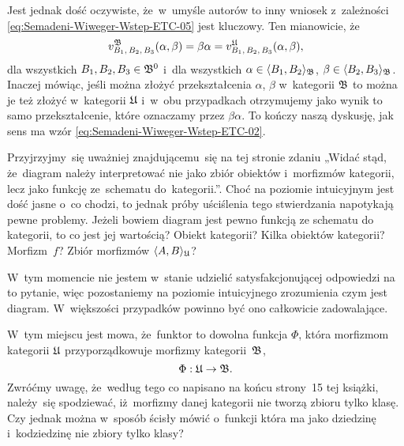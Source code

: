 \documentclass[a4paper,11pt]{article}
\numberwithin{equation}{section}
\begin{document}
Jest jednak dość oczywiste, że~w~umyśle autorów to inny wniosek z~zależności
\eqref{eq:Semadeni-Wiweger-Wstep-ETC-05} jest kluczowy. Ten mianowicie, że
\begin{equation}
  \label{eq:Semadeni-Wiweger-Wstep-ETC-07}
  v_{ B_{ 1 }, \, B_{ 2 }, \, B_{ 3 } }^{ \mathfrak{B} }( \alpha, \beta ) =
  \beta \alpha =
  v_{ B_{ 1 }, \, B_{ 2 }, \, B_{ 3 } }^{ \mathfrak{U} }( \alpha, \beta ),
\end{equation}
dla wszystkich $B_{ 1 }, B_{ 2 }, B_{ 3 } \in \mathfrak{B}^{ 0 }$ i~dla wszystkich
$\alpha \in \langle B_{ 1 }, B_{ 2 } \rangle_{ \mathfrak{B} }$, $\beta \in \langle B_{ 2 }, B_{ 3 } \rangle_{ \mathfrak{B} }$.
Inaczej mówiąc, jeśli można złożyć przekształcenia $\alpha$, $\beta$ w~kategorii
$\mathfrak{B}$ to można je też złożyć w~kategorii $\mathfrak{U}$ i~w~obu przypadkach
otrzymujemy jako wynik to samo przekształcenie, które oznaczamy przez
$\beta \alpha$. To kończy naszą dyskusję, jak sens ma wzór
\eqref{eq:Semadeni-Wiweger-Wstep-ETC-02}.

\VerSpaceFour





\noindent
{} Przyjrzyjmy~się uważniej znajdującemu~się na tej stronie zdaniu
„Widać stąd, że~diagram należy interpretować nie jako zbiór obiektów
i~morfizmów kategorii, lecz jako funkcję ze~schematu do~kategorii.”. Choć na
poziomie intuicyjnym jest dość jasne o~co chodzi, to jednak próby uściślenia
tego stwierdzania napotykają pewne problemy. Jeżeli bowiem diagram jest
pewno funkcją ze schematu do kategorii, to co jest jej wartością? Obiekt
kategorii? Kilka obiektów kategorii? Morfizm~$f$? Zbiór morfizmów
$\langle A, B \rangle_{ \mathfrak{U} }$?

W~tym momencie nie jestem w~stanie udzielić satysfakcjonującej odpowiedzi na
to pytanie, więc pozostaniemy na poziomie intuicyjnego zrozumienia czym jest
diagram. W~większości przypadków powinno być ono całkowicie zadowalające.

\VerSpaceFour





\noindent
{} W~tym miejscu jest mowa, że~funktor to dowolna funkcja $\Phi$, która
morfizmom kategorii $\mathfrak{U}$ przyporządkowuje morfizmy kategorii~$\mathfrak{B}$,
\begin{equation}
  \label{eq:Semadeni-Wiweger-Wstep-ETC-08}
  \Phi : \mathfrak{U} \to \mathfrak{B}.
\end{equation}
Zwróćmy uwagę, że~według tego co napisano na końcu strony~15 tej książki,
należy~się spodziewać, iż~morfizmy danej kategorii nie tworzą zbioru tylko
klasę. Czy jednak można w~sposób ścisły mówić o~funkcji która ma jako
dziedzinę i~kodziedzinę nie zbiory tylko klasy?
\end{document}
